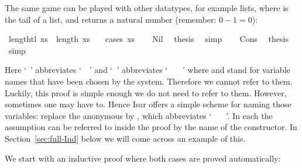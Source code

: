 \begin{isabellebody}
\begin{isamarkuptext}
The same game can be played with other datatypes, for example lists,
where  is the tail of a list, and  returns a
natural number (remember: $0-1=0$):%
\end{isamarkuptext}%
\isamarkuptrue%
\isamarkupfalse%
\ {\isachardoublequoteopen}length{\isacharparenleft}tl\ xs{\isacharparenright}\ {\isacharequal}\ length\ xs\ {\isacharminus}\ {}{\isachardoublequoteclose}\isanewline
%
\isadelimproof
%
\endisadelimproof
%
\isatagproof
{}\isamarkupfalse%
\ {\isacharparenleft}cases\ xs{\isacharparenright}\isanewline
\ \ \isamarkupfalse%
\ Nil\ \isamarkupfalse%
\ {\isacharquery}thesis\ \isamarkupfalse%
\ simp\isanewline
{}\isamarkupfalse%
\isanewline
\ \ \isamarkupfalse%
\ Cons\ \isamarkupfalse%
\ {\isacharquery}thesis\ \isamarkupfalse%
\ simp\isanewline
{}\isamarkupfalse%
%
\endisatagproof
{\isafoldproof}%
%
\isadelimproof
%
\endisadelimproof
%
\begin{isamarkuptext}%
\noindent Here `~' abbreviates
`~~' and
`~'
abbreviates `~\isa{{\isacharquery}\ {\isacharquery}{\isacharquery}}
~~'
where \isa{{\isacharquery}} and \isa{{\isacharquery}{\isacharquery}}
stand for variable names that have been chosen by the system.
Therefore we cannot refer to them.
Luckily, this proof is simple enough we do not need to refer to them.
However, sometimes one may have to. Hence Isar offers a simple scheme for
naming those variables: replace the anonymous  by
, which abbreviates `~
~~'.
In each  the assumption can be
referred to inside the proof by the name of the constructor. In
Section~\ref{sec:full-Ind} below we will come across an example
of this.%
\end{isamarkuptext}%
\isamarkuptrue%
%
\isamarkuptrue%
%
\begin{isamarkuptext}%
We start with an inductive proof where both cases are proved automatically:%

\end{isamarkuptext}
\end{isabellebody}
